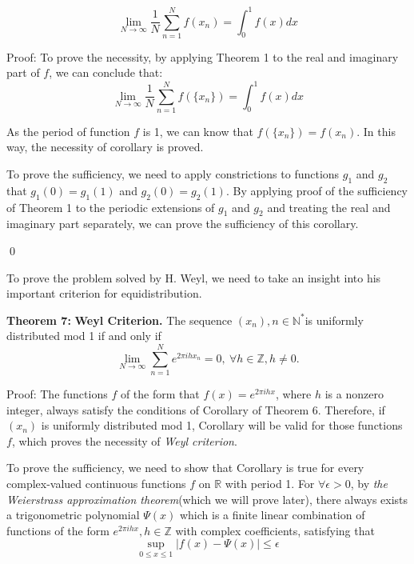 \documentclass[12pt]{article}
\begin{document}
\begin{equation*}
\lim_{N\to\infty}\frac{1}{N}\sum_{n=1}^{N}f(x_n)=\int_{0}^{1}f(x)dx
\end{equation*}
\par Proof: To prove the necessity, by applying Theorem 1 to the real and imaginary part of $f$, we can conclude that:
\begin{equation*}
\lim_{N\to\infty}\frac{1}{N}\sum_{n=1}^{N}f(\{x_n\})=\int_{0}^{1}f(x)dx
\end{equation*}
\par As the period of function $f$ is 1, we can know that $f(\{x_n\})=f(x_n)$. In this way, the necessity of corollary is proved. 
\par To prove the sufficiency, we need to apply constrictions to functions $g_1$ and $g_2$ that $g_1(0)=g_1(1)$ and $g_2(0)=g_2(1)$. By applying proof of the sufficiency of Theorem 1 to the periodic extensions of $g_1$ and $g_2$ and treating the real and imaginary part separately, we can prove the sufficiency of this corollary.
\par \qed
\par To prove the problem solved by H. Weyl, we need to take an insight into his important criterion for equidistribution.
\par {\textbf{Theorem 7:}} \textbf{Weyl Criterion.} The sequence $(x_n), n\in \mathbb{N^*}$is uniformly distributed mod 1 if and only if
\begin{equation*}
\lim_{N\to\infty}\sum_{n=1}^{N}e^{2\pi ihx_n}=0,\  \forall h\in \mathbb{Z}, h\neq0.
\end{equation*}
\par Proof: The functions $f$ of the form that $f(x)=e^{2\pi ihx}$, where $h$ is a nonzero integer, always satisfy the conditions of Corollary of Theorem 6. Therefore, if $(x_n)$ is uniformly distributed mod 1, Corollary will be valid for those functions $f$, which proves the necessity of \emph{Weyl criterion}. 
\par To prove the sufficiency, we need to show that Corollary is true for every complex-valued continuous functions $f$ on $\mathbb{R}$ with period 1. For $\forall \epsilon >0$, by \emph{the Weierstrass approximation theorem}(which we will prove later), there always exists a trigonometric polynomial $\Psi(x)$ which is a finite linear combination of functions of the form $e^{2\pi ihx}, h\in \mathbb{Z}$ with complex coefficients, satisfying that 
\begin{equation*}
\sup_{0\leq x\leq1}|f(x)-\Psi(x)|\leq \epsilon
\end{equation*}
\end{document}
